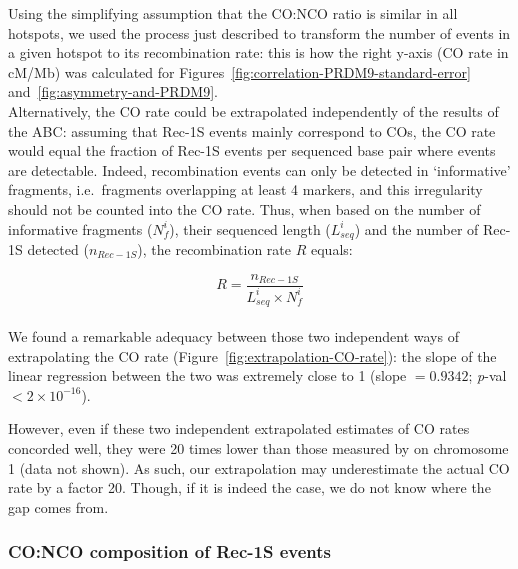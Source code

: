 Using the simplifying assumption that the CO:NCO ratio is similar in all hotspots, we used the process just described to transform the number of events in a given hotspot to its recombination rate: this is how the right y-axis (CO rate in cM/Mb) was calculated for Figures~\ref{fig:correlation-PRDM9-standard-error} and~\ref{fig:asymmetry-and-PRDM9}.\\

Alternatively, the CO rate could be extrapolated independently of the results of the ABC\@: assuming that Rec-1S events mainly correspond to COs, the CO rate would equal the fraction of Rec-1S events per sequenced base pair where events are detectable.
Indeed, recombination events can only be detected in ‘informative’ fragments, i.e.\ fragments overlapping at least 4 markers, and this irregularity should not be counted into the CO rate.
Thus, when based on the number of informative fragments ($N^{i}_{f}$), their sequenced length ($L^{i}_{seq}$) and the number of Rec-1S detected ($n_{Rec-1S}$), the recombination rate $R$ equals:

\begin{equation*}
    R = \frac{n_{Rec-1S}}{L^{i}_{seq} \times N^{i}_{f}}
\end{equation*}\\



We found a remarkable adequacy between those two independent ways of extrapolating the CO rate (Figure~\ref{fig:extrapolation-CO-rate}): the slope of the linear regression between the two was extremely close to 1 (slope $ =0.9342$; \textit{p}-val $< 2 \times 10^{-16}$).


However, even if these two independent extrapolated estimates of CO rates concorded well, they were 20 times lower than those measured by \citet{paigen2008recombinational} on chromosome 1 (data not shown). 
As such, our extrapolation may underestimate the actual CO rate by a factor 20. Though, if it is indeed the case, we do not know where the gap comes from.






\subsubsection{CO:NCO composition of Rec-1S events}

